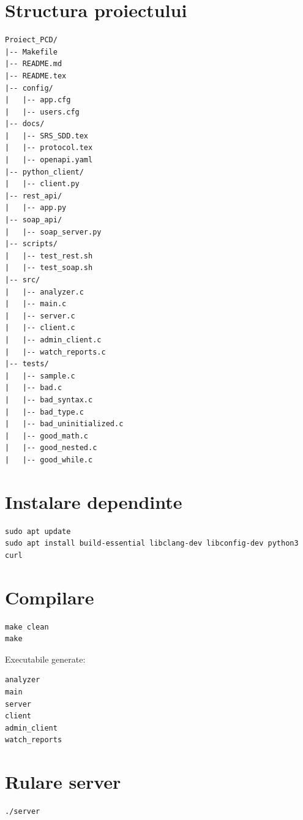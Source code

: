 \documentclass[12pt,a4paper]{article}
\begin{document}
\section{Structura proiectului}

\begin{lstlisting}[style=code]
Proiect_PCD/
|-- Makefile
|-- README.md
|-- README.tex
|-- config/
|   |-- app.cfg
|   |-- users.cfg
|-- docs/
|   |-- SRS_SDD.tex
|   |-- protocol.tex
|   |-- openapi.yaml
|-- python_client/
|   |-- client.py
|-- rest_api/
|   |-- app.py
|-- soap_api/
|   |-- soap_server.py
|-- scripts/
|   |-- test_rest.sh
|   |-- test_soap.sh
|-- src/
|   |-- analyzer.c
|   |-- main.c
|   |-- server.c
|   |-- client.c
|   |-- admin_client.c
|   |-- watch_reports.c
|-- tests/
|   |-- sample.c
|   |-- bad.c
|   |-- bad_syntax.c
|   |-- bad_type.c
|   |-- bad_uninitialized.c
|   |-- good_math.c
|   |-- good_nested.c
|   |-- good_while.c
\end{lstlisting}

\section{Instalare dependinte}

\begin{lstlisting}[style=code]
sudo apt update
sudo apt install build-essential libclang-dev libconfig-dev python3 curl
\end{lstlisting}

\section{Compilare}

\begin{lstlisting}[style=code]
make clean
make
\end{lstlisting}

Executabile generate:

\begin{lstlisting}[style=code]
analyzer
main
server
client
admin_client
watch_reports
\end{lstlisting}

\section{Rulare server}

\begin{lstlisting}[style=code]
./server
\end{lstlisting}
\end{document}
